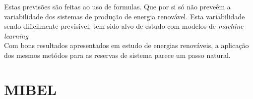 Estas previsões são feitas ao uso de formulas. Que por si só não preveêm a variabilidade dos sistemas de produção de energia renovável. Esta variabilidade sendo dificilmente previsivel, tem sido alvo de estudo com modelos de \textit{machine learning} \cite{} \\
Com bons resultados apresentados em estudo de energias renováveis, a aplicação dos mesmos metódos para as reservas de sistema parece um passo natural. \\



\section{MIBEL \label{se:mibel}}
\cite{Bessa2012}
\cite{Carneiro2016}
\cite{Fernandes2016}
\citep{Agostini2021}

